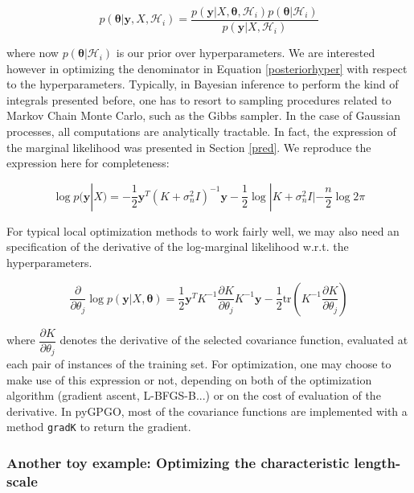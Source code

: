 \documentclass[10pt,a4paper,twoside]{book}
\begin{document}
\begin{equation}
\label{posteriorhyper}
p(\boldsymbol{\theta}|\boldsymbol{y}, X, \mathcal{H}_i) = \dfrac{p(\boldsymbol{y}|X, \boldsymbol{\theta}, \mathcal{H}_i)p(\boldsymbol{\theta}|\mathcal{H}_i)}{p(\boldsymbol{y}|X, \mathcal{H}_i)}
\end{equation}

where now $p(\boldsymbol{\theta}|\mathcal{H}_i)$ is our prior over hyperparameters. We are interested however in optimizing the denominator in Equation \ref{posteriorhyper} with respect to the hyperparameters. Typically, in Bayesian inference to perform the kind of integrals presented before, one has to resort to sampling procedures related to Markov Chain Monte Carlo, such as the Gibbs sampler. In the case of Gaussian processes, all computations are analytically tractable. In fact, the expression of the marginal likelihood was presented in Section \ref{pred}. We reproduce the expression here for completeness:

\begin{equation}
\log p(\boldsymbol{y}|X) = - \dfrac{1}{2}\boldsymbol{y}^T(K + \sigma^2_n I)^{-1}\boldsymbol{y} - \dfrac{1}{2}\log |K + \sigma^2_n I| - \dfrac{n}{2}\log 2\pi
\end{equation}

For typical local optimization methods to work fairly well, we may also need an specification of the derivative of the log-marginal likelihood w.r.t. the hyperparameters.

\begin{equation}
\dfrac{\partial}{\partial \theta_j}\log p(\boldsymbol{y}|X, \boldsymbol{\theta}) = \dfrac{1}{2}\boldsymbol{y}^T K^{-1}\dfrac{\partial K}{\partial \theta_j}K^{-1}\boldsymbol{y} - \dfrac{1}{2}\textrm{tr}\left(K^{-1} \dfrac{\partial K}{\partial \theta_j} \right)
\end{equation}

where $\dfrac{\partial K}{\partial \theta_j}$ denotes the derivative of the selected covariance function, evaluated at each pair of instances of the training set. For optimization, one may choose to make use of this expression or not, depending on both of the optimization algorithm (gradient ascent, L-BFGS-B...) or on the cost of evaluation of the derivative. In pyGPGO, most of the covariance functions are implemented with a method \texttt{gradK} to return the gradient. 

\subsubsection{Another toy example: Optimizing the characteristic length-scale}
\end{document}
